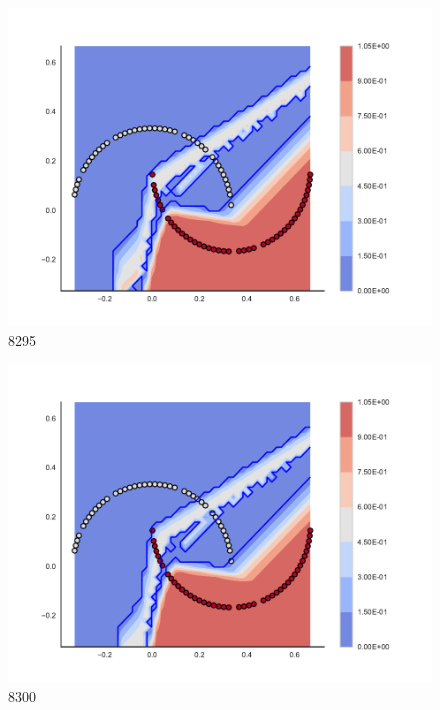 \begin{subfigure}[b]{0.09\textwidth}
    \includegraphics[clip, trim=2.35cm 1.75cm 4.5cm 0cm,width=\textwidth]{img/convergence/8295.pdf}
    \caption{8295}
    \label{fig:convergence_8295}
\end{subfigure}
%
\begin{subfigure}[b]{0.09\textwidth}
    \includegraphics[clip, trim=2.35cm 1.75cm 4.5cm 0cm,width=\textwidth]{img/convergence/8300.pdf}
    \caption{8300}
    \label{fig:convergence_8300}
\end{subfigure}
%
